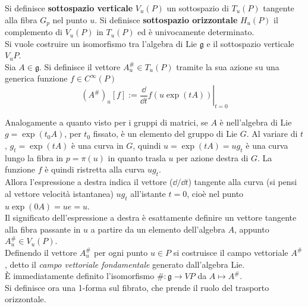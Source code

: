 Si definisce \textbf{sottospazio verticale} $V_u(P)$ un sottospazio di $T_u(P)$
tangente alla fibra $G_p$ nel punto $u$.
Si definisce \textbf{sottospazio orizzontale} $H_u(P)$ il complemento di $V_u(P)$
in $T_u(P)$ ed è univocamente determinato.\\

Si vuole costruire un isomorfismo tra l'algebra di Lie $\mathfrak{g}$ e
il sottospazio verticale $V_u P$.\\

Sia $A \in \mathfrak{g}$.
Si definisce il vettore $A_u^\# \in T_u(P)$ tramite la sua azione su una generica
funzione $f \in C^\infty(P)$
$$
   (A^\#)_u [f] := \left. \frac{\dd}{\dd t} f(u \exp(tA)) \right|_{t=0}
$$

Analogamente a quanto visto per i gruppi di matrici, se $A$ è nell'algebra di Lie
$g = \exp(t_0 A)$, per $t_0$ fissato, è un elemento del gruppo di Lie $G$.
Al variare di $t$, $g_t = \exp(tA)$ è una curva in $G$, quindi $u = \exp(tA) = ug_t$
è una curva lungo la fibra in $p = \pi(u)$ in quanto trasla $u$ per azione
destra di $G$. La funzione $f$ è quindi ristretta alla curva $ug_t$. \\
Allora  l'espressione a destra indica il vettore ($\dd / \dd t$) tangente alla curva
(si pensi al vettore velocità istantanea) $ug_t$ all'istante $t=0$, cioè nel punto
$u\exp(0A) = ue = u$.\\

Il significato dell'espressione a destra è esattamente definire
un vettore tangente alla fibra passante in $u$ a partire da
un elemento dell'algebra $A$, appunto $A^\#_u \in V_u(P)$.\\

Definendo il vettore $A^\#_u$ per ogni punto $u \in P$ si costruisce il campo
vettoriale $A^\#$, detto il \emph{campo vettoriale fondamentale} generato
dall'algebra Lie.\\

È immediatamente definito l'isomorfismo $\# : \mathfrak{g} \to VP$ da $A \mapsto A^\#$.\\

Si definisce ora una 1-forma sul fibrato, che prende il ruolo del trasporto
orizzontale.

